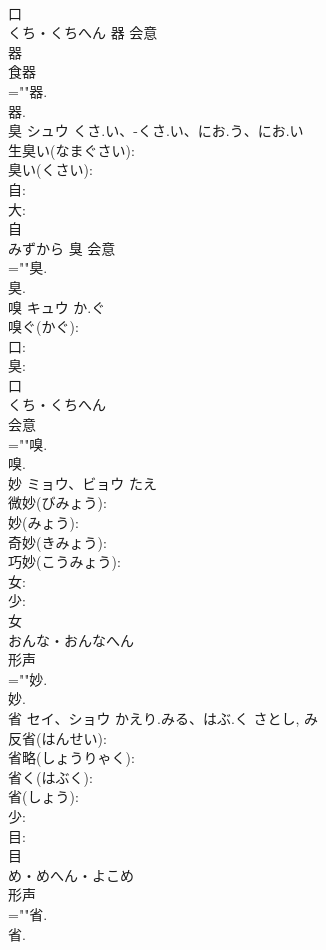 \documentclass[8pt]{extreport}
\begin{document}
\begin{CJK}{UTF8}{min}
\\	口	
\\	くち・くちへん	器	会意 
\\	器 
\\	食器 
\\	=""器.
\\	器.
\\	臭	シュウ	くさ.い、-くさ.い、にお.う、にお.い		
\\	生臭い(なまぐさい): 
\\	臭い(くさい): 
\\	自: 
\\	大: 
\\	自	
\\	みずから	臭	会意 
\\	=""臭.
\\	臭.
\\	嗅	キュウ	か.ぐ		
\\	嗅ぐ(かぐ): 
\\	口: 
\\	臭: 
\\	口	
\\	くち・くちへん	
\\	会意 
\\	=""嗅.
\\	嗅.
\\	妙	ミョウ、ビョウ	たえ		
\\	微妙(びみょう): 
\\	妙(みょう): 
\\	奇妙(きみょう): 
\\	巧妙(こうみょう): 
\\	女: 
\\	少: 
\\	女	
\\	おんな・おんなへん	
\\	形声 
\\	=""妙.
\\	妙.
\\	省	セイ、ショウ	かえり.みる、はぶ.く	さとし, み	
\\	反省(はんせい): 
\\	省略(しょうりゃく): 
\\	省く(はぶく): 
\\	省(しょう): 
\\	少: 
\\	目: 
\\	目	
\\	め・めへん・よこめ	
\\	形声 
\\	=""省.
\\	省.

\end{CJK}
\end{document}
